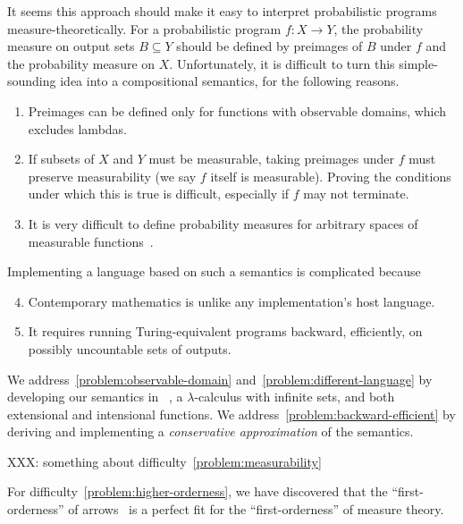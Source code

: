 \documentclass{llncs}
\begin{document}
It seems this approach should make it easy to interpret probabilistic programs measure-theoretically.
For a probabilistic program $f : X \to Y$, the probability measure on output sets $B \subseteq Y$ should be defined by preimages of $B$ under $f$ and the probability measure on $X$.
Unfortunately, it is difficult to turn this simple-sounding idea into a compositional semantics, for the following reasons.
\begin{enumerate}
	\item Preimages can be defined only for functions with observable domains, which excludes lambdas.%
\label{problem:observable-domain}
	\item If subsets of $X$ and $Y$ must be measurable, taking preimages under $f$ must preserve measurability (we say $f$ itself is measurable). Proving the conditions under which this is true is difficult, especially if $f$ may not terminate.%
\label{problem:measurability}
	\item It is very difficult to define probability measures for arbitrary spaces of measurable functions~\cite{cit:aumann-1961ijm-borel}.%
\label{problem:higher-orderness}
\end{enumerate}
Implementing a language based on such a semantics is complicated because
\begin{enumerate}
	\setcounter{enumi}{3}
	\item Contemporary mathematics is unlike any implementation's host language.%
\label{problem:different-language}
	\item It requires running Turing-equivalent programs backward, efficiently, on possibly uncountable sets of outputs.%
\label{problem:backward-efficient}
\end{enumerate}

We address~\ref{problem:observable-domain} and~\ref{problem:different-language} by developing our semantics in \lzfclang~\cite{cit:toronto-2012flops-lzfc}, a $\lambda$-calculus with infinite sets, and both extensional and intensional functions.
We address~\ref{problem:backward-efficient} by deriving and implementing a \emph{conservative approximation} of the semantics.

XXX: something about difficulty~\ref{problem:measurability}

For difficulty~\ref{problem:higher-orderness}, we have discovered that the ``first-orderness'' of arrows~\cite{cit:hughes-2000scp-arrows} is a perfect fit for the ``first-orderness'' of measure theory.

\end{document}
